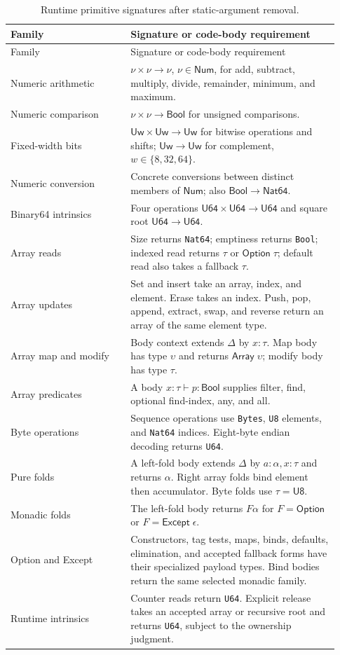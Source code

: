 \documentclass[11pt]{article}
\newcommand{\code}[1]{\texttt{#1}}
\newcommand{\ty}[1]{\mathsf{#1}}
\begin{document}
\begin{longtable}{L{0.34\linewidth}L{0.59\linewidth}}
\caption{Runtime primitive signatures after static-argument removal.}\label{tab:primitives}\\
\toprule Family & Signature or code-body requirement\\\midrule\endfirsthead
\toprule Family & Signature or code-body requirement\\\midrule\endhead
Numeric arithmetic & $\nu\times\nu\to\nu$, $\nu\in\ty{Num}$, for add, subtract, multiply, divide, remainder, minimum, and maximum.\\
Numeric comparison & $\nu\times\nu\to\ty{Bool}$ for unsigned comparisons.\\
Fixed-width bits & $\ty{Uw}\times\ty{Uw}\to\ty{Uw}$ for bitwise operations and shifts; $\ty{Uw}\to\ty{Uw}$ for complement, $w\in\{8,32,64\}$.\\
Numeric conversion & Concrete conversions between distinct members of $\ty{Num}$; also $\ty{Bool}\to\ty{Nat64}$.\\
Binary64 intrinsics & Four operations $\ty{U64}\times\ty{U64}\to\ty{U64}$ and square root $\ty{U64}\to\ty{U64}$.\\
Array reads & Size returns \code{Nat64}; emptiness returns \code{Bool}; indexed read returns $\tau$ or $\ty{Option}\;\tau$; default read also takes a fallback $\tau$.\\
Array updates & Set and insert take an array, index, and element.  Erase takes an index.  Push, pop, append, extract, swap, and reverse return an array of the same element type.\\
Array map and modify & Body context extends $\Delta$ by $x:\tau$.  Map body has type $\upsilon$ and returns $\ty{Array}\;\upsilon$; modify body has type $\tau$.\\
Array predicates & A body $x:\tau\vdash p:\ty{Bool}$ supplies filter, find, optional find-index, any, and all.\\
Byte operations & Sequence operations use \code{Bytes}, \code{U8} elements, and \code{Nat64} indices.  Eight-byte endian decoding returns \code{U64}.\\
Pure folds & A left-fold body extends $\Delta$ by $a:\alpha,x:\tau$ and returns $\alpha$.  Right array folds bind element then accumulator.  Byte folds use $\tau=\ty{U8}$.\\
Monadic folds & The left-fold body returns $F\alpha$ for $F=\ty{Option}$ or $F=\ty{Except}\;\epsilon$.\\
Option and Except & Constructors, tag tests, maps, binds, defaults, elimination, and accepted fallback forms have their specialized payload types.  Bind bodies return the same selected monadic family.\\
Runtime intrinsics & Counter reads return \code{U64}.  Explicit release takes an accepted array or recursive root and returns \code{U64}, subject to the ownership judgment.\\
\bottomrule
\end{longtable}
\end{document}
